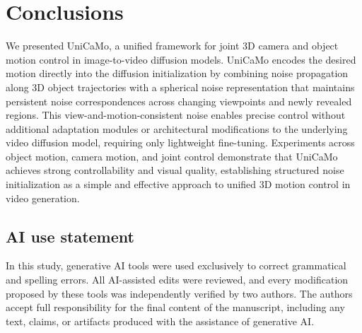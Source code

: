 \ifdefined\arxivbuild\else\documentclass{article}\fi %
\begin{document}


\section{Conclusions}
\label{sec:conclusion}
We presented UniCaMo, a unified framework for joint 3D camera and object motion control in image-to-video diffusion models. UniCaMo encodes the desired motion directly into the diffusion initialization by combining noise propagation along 3D object trajectories with a spherical noise representation that maintains persistent noise correspondences across changing viewpoints and newly revealed regions. This view-and-motion-consistent noise enables precise control without additional adaptation modules or architectural modifications to the underlying video diffusion model, requiring only lightweight fine-tuning. Experiments across object motion, camera motion, and joint control demonstrate that UniCaMo achieves strong controllability and visual quality, establishing structured noise initialization as a simple and effective approach to unified 3D motion control in video generation.
\FloatBarrier


\subsection*{AI use statement}
In this study, generative AI tools were used exclusively to correct grammatical and spelling errors. All AI-assisted edits were reviewed, and every modification proposed by these tools was independently verified by two authors. The authors accept full responsibility for the final content of the manuscript, including any text, claims, or artifacts produced with the assistance of generative AI.
\end{document}
